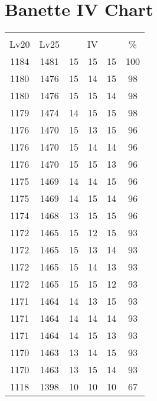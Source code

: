 \documentclass{article}%
\begin{document}
%
\normalsize%
\section{Banette IV Chart}%
\label{sec:Banette IV Chart}%
\renewcommand{\arraystretch}{1.5}%
\begin{tabular}{|c|c|c|c|c|c|}%
\hline%
\multicolumn{6}{|c|}{\textcolor{white}{ 
\linebreak{Banette}
}%
\cellcolor{black}}\\%
\multicolumn{1}{|c}{Lv20}&\multicolumn{1}{c|}{Lv25}&\multicolumn{3}{c|}{IV}&\multicolumn{1}{|c|}{\%}\\%
\hline%
\rowcolor{color100}%
1184&1481&15&15&15&100\\%
\hline%
\rowcolor{color98}%
1180&1476&15&14&15&98\\%
\hline%
\rowcolor{color98}%
1180&1476&15&15&14&98\\%
\hline%
\rowcolor{color98}%
1179&1474&14&15&15&98\\%
\hline%
\rowcolor{color96}%
1176&1470&15&13&15&96\\%
\hline%
\rowcolor{color96}%
1176&1470&15&14&14&96\\%
\hline%
\rowcolor{color96}%
1176&1470&15&15&13&96\\%
\hline%
\rowcolor{color96}%
1175&1469&14&14&15&96\\%
\hline%
\rowcolor{color96}%
1175&1469&14&15&14&96\\%
\hline%
\rowcolor{color96}%
1174&1468&13&15&15&96\\%
\hline%
\rowcolor{color93}%
1172&1465&15&12&15&93\\%
\hline%
\rowcolor{color93}%
1172&1465&15&13&14&93\\%
\hline%
\rowcolor{color93}%
1172&1465&15&14&13&93\\%
\hline%
\rowcolor{color93}%
1172&1465&15&15&12&93\\%
\hline%
\rowcolor{color93}%
1171&1464&14&13&15&93\\%
\hline%
\rowcolor{color93}%
1171&1464&14&14&14&93\\%
\hline%
\rowcolor{color93}%
1171&1464&14&15&13&93\\%
\hline%
\rowcolor{color93}%
1170&1463&13&14&15&93\\%
\hline%
\rowcolor{color93}%
1170&1463&13&15&14&93\\%
\hline%
\rowcolor{color91}%
1118&1398&10&10&10&67\\%
\end{tabular}

%
\end{document}
